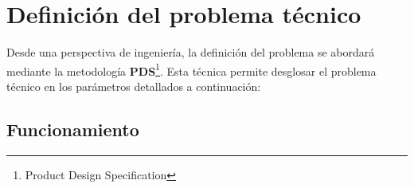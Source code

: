 \documentclass[a4paper,12pt,twoside,final]{book}
\begin{document}

\section{Definición del problema técnico}
Desde una perspectiva de ingeniería, la definición del problema se abordará mediante la metodología \textbf{PDS}\footnote{Product Design Specification}. Esta técnica permite desglosar el problema técnico en los parámetros detallados a continuación:
\subsection{Funcionamiento}
\end{document}
